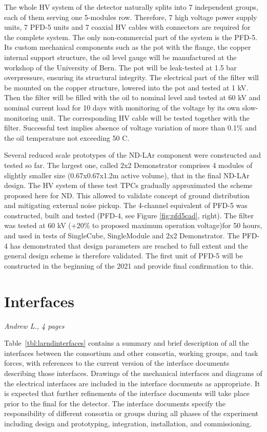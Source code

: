 The whole HV system of the detector naturally splits into 7 independent groups, each of them serving one 5-modules row.
Therefore, 7 high voltage power supply units, 7 PFD-5 units and 7 coaxial HV cables with connectors are required for the complete system. The only non-commercial part of the system is the PFD-5. Its custom mechanical components such as the pot with the flange, the copper internal support structure, the oil level gauge will be manufactured at the workshop of the University of Bern.
The pot will be leak-tested at 1.5 bar overpressure, ensuring its structural integrity. The electrical part of the filter will be mounted on the copper structure, lowered into the pot and tested at 1 kV. Then the filter will be filled with the oil to nominal level and tested at 60 kV and nominal current load for 10 days with monitoring of the voltage by its own slow-monitoring unit. The corresponding HV cable will be tested together with the filter. Successful test implies absence of voltage variation of more than 0.1\% and the oil temperature not exceeding 50 C.


Several reduced scale prototypes of the ND-LAr component were constructed and tested so far. The largest one, called 2x2 Demonstrator comprises 4 modules of slightly smaller size (0.67x0.67x1.2m active volume), that in the final ND-LAr design. The HV system of these test TPCs gradually approximated the scheme proposed here for ND. This allowed to validate concept of ground distribution and mitigating external noise pickup. The 4-channel equivalent of PFD-5 was constructed, built and tested (PFD-4, see Figure \ref{fig:pfd5cad}, right). The filter was tested at 60 kV (+20\% to proposed maximum operation voltage)for 50 hours, 
and used in tests of SingleCube, SingleModule and 2x2 Demonstrator. The PFD-4 has demonstrated that design parameters are reached to full extent and the general design scheme is therefore validated. The first unit of PFD-5 will be constructed in the beginning of the 2021 and provide final confirmation to this.

     
     


\section{Interfaces}
\label{sec:lartpc-interface}
{\it Andrew L., 4 pages}

Table~\ref{tbl:larndinterfaces} contains a summary and brief description of all the interfaces between the  consortium and other consortia, working groups, and task forces, with references to the current version of the interface documents describing those interfaces.  
Drawings of the mechanical interfaces and diagrams of the electrical interfaces are 
included in the interface documents as appropriate.
It is expected that further refinements of the interface documents will take place prior to the final  for the detector. The interface documents specify the responsibility of different consortia or groups during all phases of the experiment including design and prototyping, integration,  installation, and  commissioning.


